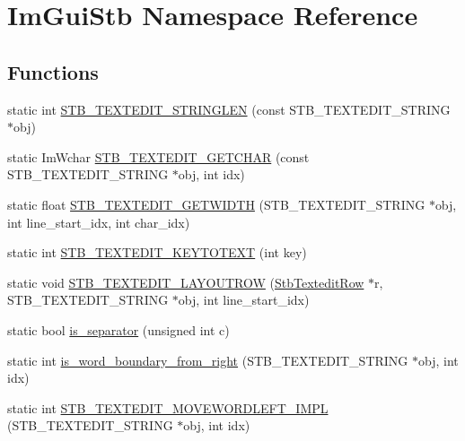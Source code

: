 \hypertarget{namespace_im_gui_stb}{}\section{Im\+Gui\+Stb Namespace Reference}
\label{namespace_im_gui_stb}
\subsection*{Functions}
\begin{DoxyCompactItemize}
\item 
static int \hyperlink{namespace_im_gui_stb_a7f0f47a15c18c3348a770c961babeb4b}{S\+T\+B\+\_\+\+T\+E\+X\+T\+E\+D\+I\+T\+\_\+\+S\+T\+R\+I\+N\+G\+L\+EN} (const S\+T\+B\+\_\+\+T\+E\+X\+T\+E\+D\+I\+T\+\_\+\+S\+T\+R\+I\+NG $\ast$obj)
\item 
static Im\+Wchar \hyperlink{namespace_im_gui_stb_a21130c94f2ec487b3c1d4316a1447174}{S\+T\+B\+\_\+\+T\+E\+X\+T\+E\+D\+I\+T\+\_\+\+G\+E\+T\+C\+H\+AR} (const S\+T\+B\+\_\+\+T\+E\+X\+T\+E\+D\+I\+T\+\_\+\+S\+T\+R\+I\+NG $\ast$obj, int idx)
\item 
static float \hyperlink{namespace_im_gui_stb_ad4b4708ebde3dbcf2608a9acfb4550d2}{S\+T\+B\+\_\+\+T\+E\+X\+T\+E\+D\+I\+T\+\_\+\+G\+E\+T\+W\+I\+D\+TH} (S\+T\+B\+\_\+\+T\+E\+X\+T\+E\+D\+I\+T\+\_\+\+S\+T\+R\+I\+NG $\ast$obj, int line\+\_\+start\+\_\+idx, int char\+\_\+idx)
\item 
static int \hyperlink{namespace_im_gui_stb_a41f9ffc3a1e11808194f0984c9b29e25}{S\+T\+B\+\_\+\+T\+E\+X\+T\+E\+D\+I\+T\+\_\+\+K\+E\+Y\+T\+O\+T\+E\+XT} (int key)
\item 
static void \hyperlink{namespace_im_gui_stb_a08ea58387e49ee5ca3cb3ca54b9665f2}{S\+T\+B\+\_\+\+T\+E\+X\+T\+E\+D\+I\+T\+\_\+\+L\+A\+Y\+O\+U\+T\+R\+OW} (\hyperlink{struct_stb_textedit_row}{Stb\+Textedit\+Row} $\ast$r, S\+T\+B\+\_\+\+T\+E\+X\+T\+E\+D\+I\+T\+\_\+\+S\+T\+R\+I\+NG $\ast$obj, int line\+\_\+start\+\_\+idx)
\item 
static bool \hyperlink{namespace_im_gui_stb_ada7de5d22e36a0bb17592c27dbafc02d}{is\+\_\+separator} (unsigned int c)
\item 
static int \hyperlink{namespace_im_gui_stb_a4e3d14415639a57b7d77dfedfa91b8f7}{is\+\_\+word\+\_\+boundary\+\_\+from\+\_\+right} (S\+T\+B\+\_\+\+T\+E\+X\+T\+E\+D\+I\+T\+\_\+\+S\+T\+R\+I\+NG $\ast$obj, int idx)
\item 
static int \hyperlink{namespace_im_gui_stb_a1303c5ec27b283a238b7129f564f3e17}{S\+T\+B\+\_\+\+T\+E\+X\+T\+E\+D\+I\+T\+\_\+\+M\+O\+V\+E\+W\+O\+R\+D\+L\+E\+F\+T\+\_\+\+I\+M\+PL} (S\+T\+B\+\_\+\+T\+E\+X\+T\+E\+D\+I\+T\+\_\+\+S\+T\+R\+I\+NG $\ast$obj, int idx)

\end{DoxyCompactItemize}
